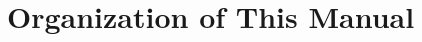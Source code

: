 %
%
%
%
%
%
%

\section{Organization of This Manual}
\label{sec:introduction:organization-of-this-manual}

